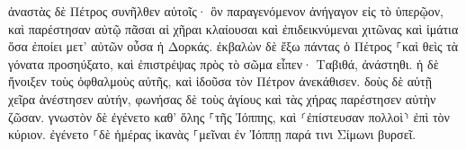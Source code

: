 \documentclass{openreader}
\begin{document}
ἀναστὰς δὲ Πέτρος συνῆλθεν αὐτοῖς· ὃν παραγενόμενον ἀνήγαγον εἰς τὸ ὑπερῷον, καὶ παρέστησαν αὐτῷ πᾶσαι αἱ χῆραι κλαίουσαι καὶ ἐπιδεικνύμεναι χιτῶνας καὶ ἱμάτια ὅσα ἐποίει μετ’ αὐτῶν οὖσα ἡ Δορκάς. 
ἐκβαλὼν δὲ ἔξω πάντας ὁ Πέτρος ⸀καὶ θεὶς τὰ γόνατα προσηύξατο, καὶ ἐπιστρέψας πρὸς τὸ σῶμα εἶπεν· Ταβιθά, ἀνάστηθι. ἡ δὲ ἤνοιξεν τοὺς ὀφθαλμοὺς αὐτῆς, καὶ ἰδοῦσα τὸν Πέτρον ἀνεκάθισεν. 
δοὺς δὲ αὐτῇ χεῖρα ἀνέστησεν αὐτήν, φωνήσας δὲ τοὺς ἁγίους καὶ τὰς χήρας παρέστησεν αὐτὴν ζῶσαν. 
γνωστὸν δὲ ἐγένετο καθ’ ὅλης ⸀τῆς Ἰόππης, καὶ ⸂ἐπίστευσαν πολλοὶ⸃ ἐπὶ τὸν κύριον. 
ἐγένετο ⸀δὲ ἡμέρας ἱκανὰς ⸀μεῖναι ἐν Ἰόππῃ παρά τινι Σίμωνι βυρσεῖ. 
\end{document}
